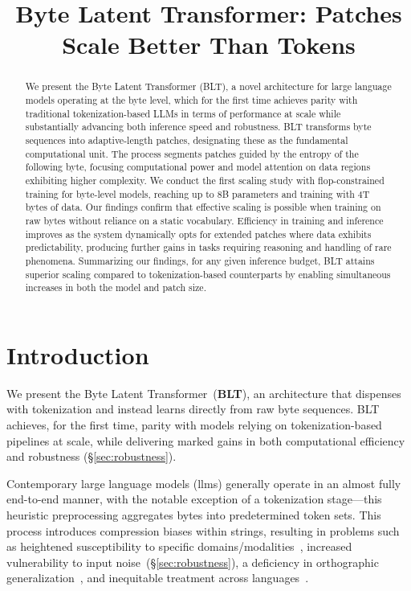 \title{Byte Latent Transformer: Patches Scale Better Than Tokens}

\begin{abstract}
We present the Byte Latent Transformer ({\textsc BLT}), a novel architecture for large language models operating at the byte level, which for the first time achieves parity with traditional tokenization-based LLMs in terms of performance at scale while substantially advancing both inference speed and robustness. 
{\textsc BLT} transforms byte sequences into adaptive-length patches, designating these as the fundamental computational unit. The process segments patches guided by the entropy of the following byte, focusing computational power and model attention on data regions exhibiting higher complexity. We conduct the first scaling study with flop-constrained training for byte-level models, reaching up to 8B parameters and training with 4T bytes of data. Our findings confirm that effective scaling is possible when training on raw bytes without reliance on a static vocabulary. Efficiency in training and inference improves as the system dynamically opts for extended patches where data exhibits predictability, producing further gains in tasks requiring reasoning and handling of rare phenomena. Summarizing our findings, for any given inference budget, {\textsc BLT} attains superior scaling compared to tokenization-based counterparts by enabling simultaneous increases in both the model and patch size.
\end{abstract}

\section{Introduction}
\label{section:intro}

We present the Byte Latent Transformer~(\textbf{BLT}), an architecture that dispenses with tokenization and instead learns directly from raw byte sequences. BLT achieves, for the first time, parity with models relying on tokenization-based pipelines at scale, while delivering marked gains in both computational efficiency and robustness (\S\ref{sec:robustness}).

Contemporary large language models (llms) generally operate in an almost fully end-to-end manner, with the notable exception of a tokenization stage—this heuristic preprocessing aggregates bytes into predetermined token sets. This process introduces compression biases within strings, resulting in problems such as heightened susceptibility to specific domains/modalities~\citep{dagangetting}, increased vulnerability to input noise~(\S\ref{sec:robustness}), a deficiency in orthographic generalization~\citep{edman2024cute}, and inequitable treatment across languages~\citep{liang2023xlm,petrov2024language,limisiewicz2024myte}.

